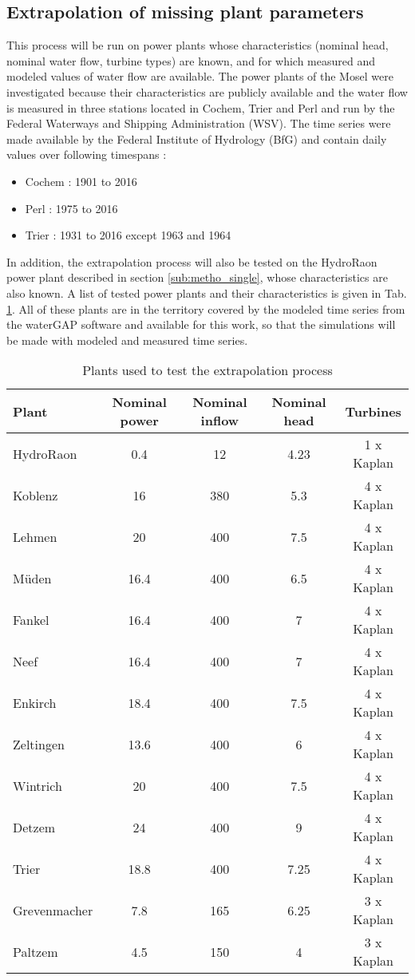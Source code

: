 \subsection{Extrapolation of missing plant parameters}
\label{sub:metho_extra}
This process will be run on power plants whose characteristics (nominal head, nominal water flow, turbine types) are known, and for which measured and modeled values of water flow are available. \newline
The power plants of the Mosel were investigated because their characteristics are publicly available \cite{mosel} and the water flow is measured in three stations located in Cochem, Trier and Perl and run by the Federal Waterways and Shipping Administration (WSV). The time series were made available by the Federal Institute of Hydrology (BfG) and contain daily values over following timespans :
\begin{itemize}
\itemsep0em
 \item Cochem \tabto{2cm}: 1901 to 2016
 \item Perl \tabto{2cm}: 1975 to 2016
 \item Trier \tabto{2cm}: 1931 to 2016 except 1963 and 1964
\end{itemize}
In addition, the extrapolation process will also be tested on the HydroRaon power plant described in section \ref{sub:metho_single}, whose characteristics are also known. A list of tested power plants and their characteristics is given in Tab. \ref{plants_to_test}. All of these plants are in the territory covered by the modeled time series from the waterGAP software and available for this work, so that the simulations will be made with modeled and measured time series.
\begin{table}
 \caption{Plants used to test the extrapolation process}
 \footnotesize
 \label{plants_to_test}
 \centering
 \begin{tabular}{|l|c|c|c|c|}
 \hline
 Plant&Nominal power&Nominal inflow&Nominal head&Turbines\\
 \hline
 HydroRaon&0.4&12&4.23&1 x Kaplan\\
 Koblenz&16&380&5.3&4 x Kaplan\\
 Lehmen&20&400&7.5&4 x Kaplan\\
 Müden&16.4&400&6.5&4 x Kaplan\\
 Fankel&16.4&400&7&4 x Kaplan\\
 Neef&16.4&400&7&4 x Kaplan\\
 Enkirch&18.4&400&7.5&4 x Kaplan\\
 Zeltingen&13.6&400&6&4 x Kaplan\\
 Wintrich&20&400&7.5&4 x Kaplan\\
 Detzem&24&400&9&4 x Kaplan\\
 Trier&18.8&400&7.25&4 x Kaplan\\
 Grevenmacher&7.8&165&6.25&3 x Kaplan\\
 Paltzem&4.5&150&4&3 x Kaplan\\
 \hline
 \end{tabular}
\end{table}


